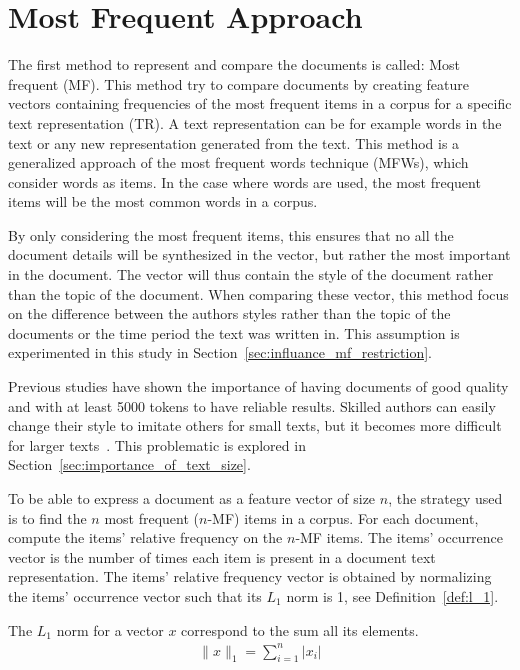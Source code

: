 \section{Most Frequent Approach}

The first method to represent and compare the documents is called: Most frequent (MF).
This method try to compare documents by creating feature vectors containing frequencies of the most frequent items in a corpus for a specific text representation (TR).
A text representation can be for example words in the text or any new representation generated from the text.
This method is a generalized approach of the most frequent words technique (MFWs), which consider words as items.
In the case where words are used, the most frequent items will be the most common words in a corpus.

By only considering the most frequent items, this ensures that no all the document details will be synthesized in the vector, but rather the most important in the document.
The vector will thus contain the style of the document rather than the topic of the document.
When comparing these vector, this method focus on the difference between the authors styles rather than the topic of the documents or the time period the text was written in.
This assumption is experimented in this study in Section~\ref{sec:influance_mf_restriction}.

Previous studies have shown the importance of having documents of good quality and with at least 5000 tokens to have reliable results.
Skilled authors can easily change their style to imitate others for small texts, but it becomes more difficult for larger texts~\cite{savoy_stylo}.
This problematic is explored in Section~\ref{sec:importance_of_text_size}.

To be able to express a document as a feature vector of size $n$, the strategy used is to find the $n$ most frequent ($n$-MF) items in a corpus.
For each document, compute the items' relative frequency on the $n$-MF items.
The items' occurrence vector is the number of times each item is present in a document text representation.
The items' relative frequency vector is obtained by normalizing the items' occurrence vector such that its $L_1$ norm is 1, see Definition~\ref{def:l_1}.

\begin{definition}[$L_1$ norm]
  \label{def:l_1}
  The $L_1$ norm for a vector $x$ correspond to the sum all its elements.
  \begin{gather*}
    \|x\|_{1} = \sum _{i=1}^{n} \left| x_{i} \right|
  \end{gather*}
\end{definition}

